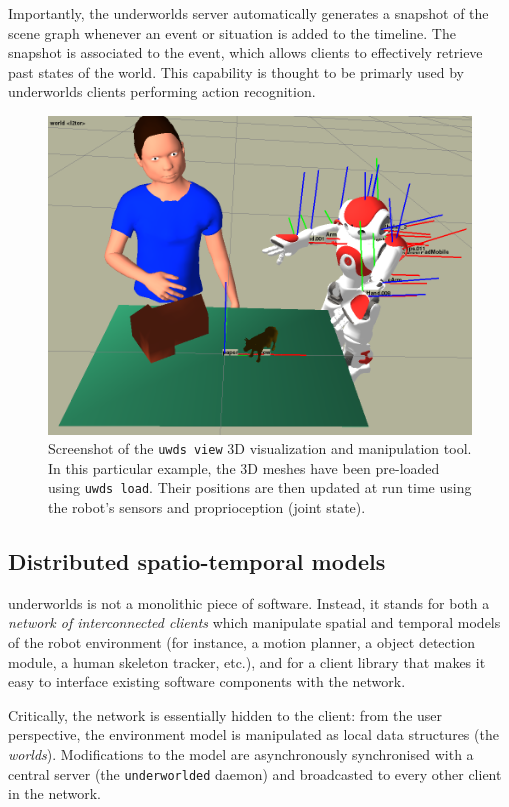 \documentclass[letterpaper, 10 pt, conference]{ieeeconf}  %
\newcommand{\uwds}{{\sc underworlds}\xspace}
\begin{document}
Importantly, the \uwds server automatically generates a snapshot of
the scene graph whenever an event or situation is added to the timeline. The
snapshot is associated to the event, which allows clients to effectively retrieve past
states of the world. This capability is thought to be primarly used by \uwds clients
performing action recognition.

\begin{figure}
    \centering
    \includegraphics[width=\linewidth]{uwds-screenshot}
    \caption{Screenshot of the {\tt uwds view} 3D visualization and manipulation
    tool. In this particular example, the 3D meshes have been pre-loaded using
    {\tt uwds load}. Their positions are then updated at run time using the
    robot's sensors and proprioception (joint state).}
    \label{fig|uwds-view}
\end{figure}

\subsection{Distributed spatio-temporal models}
\label{arch}

\uwds is not a monolithic piece of software. Instead, it stands for both a
\emph{network of interconnected clients} which manipulate spatial and temporal
models of the robot environment (for instance, a motion planner, a object
detection module, a human skeleton tracker, etc.), and for a {client library}
that makes it easy to interface existing software components with the network.

Critically, the network is essentially hidden to the client: from the user
perspective, the environment model is manipulated as local data structures (the
\emph{worlds}). Modifications to the model are asynchronously synchronised with
a central server (the {\tt underworlded} daemon) and broadcasted to every other
client in the network.
\end{document}
